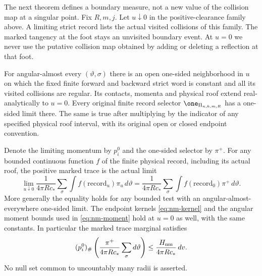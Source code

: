 The next theorem defines a boundary measure, not a new value of the
collision map at a singular point.  Fix $R,m,j$.  Let $u\downarrow0$
in the positive-clearance family above.  A limiting strict record
lists the actual visited collisions of this family.  The marked
tangency at the foot stays an unvisited boundary event.  At $u=0$
we never use the putative collision map obtained by adding or
deleting a reflection at that foot.

\begin{theorem}
\label{thm:nm-trace}
For angular-almost every $(\vartheta,\sigma)$ there is an open
one-sided neighborhood in $u$ on which the fixed finite forward
and backward strict word is constant and all its visited collisions
are regular.  Its contacts, momenta and physical roof extend
real-analytically to $u=0$.  Every original finite record selector
$\one_{\Pi_{n,k,m,R}}$ has a one-sided limit there.  The same is
true after multiplying by the indicator of any specified physical
roof interval, with its original open or closed endpoint convention.

Denote the limiting momentum by $p_i^0$ and the one-sided selector
by $\pi^+$.  For any bounded continuous function $f$ of the finite
physical record, including its actual roof, the positive marked
trace is the actual limit
\begin{equation}\label{eq:nm-trace}
 \lim_{u\downarrow0}\frac1{4\pi R c_*}
   \sum_\sigma\int f(\mathrm{record}_u)\pi_u\,d\vartheta
 =\frac1{4\pi R c_*}
   \sum_\sigma\int f(\mathrm{record}_0)\pi^+\,d\vartheta.
\end{equation}
More generally the equality holds for any bounded test with an
angular-almost-everywhere one-sided limit.  The endpoint kernels
\eqref{eq:nm-kernel} and the angular moment bounds used in
\eqref{eq:nm-moment} hold at $u=0$ as well, with the same constants.
In particular the marked trace marginal satisfies
\begin{equation}\label{eq:nm-trace-marginal}
 (p_i^0)_\#\left(\frac{\pi^+}{4\pi R c_*}
                          \sum_\sigma d\vartheta\right)
             \le\frac{H_{\rm nm}}{4\pi R c_*}\,dv.
\end{equation}
No null set common to uncountably many radii is asserted.
\end{theorem}
